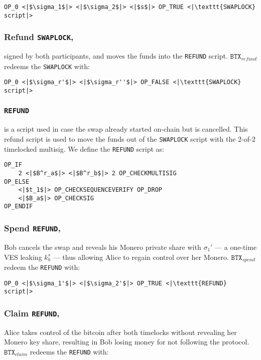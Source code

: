 \documentclass{llncs}
\newcommand{\BTX}{\texttt{BTX}}
\begin{document}
\begin{verbatim}
OP_0 <|$\sigma_1$|> <|$\sigma_2$|> <|$s$|> OP_TRUE <|\texttt{SWAPLOCK} script|>
\end{verbatim}

\subsubsection{Refund \texttt{SWAPLOCK},}
signed by both participants, and moves the funds into the \texttt{REFUND} script. $\BTX_\textit{refund}$ redeems the \texttt{SWAPLOCK} with:

\begin{verbatim}
OP_0 <|$\sigma_r'$|> <|$\sigma_r''$|> OP_FALSE <|\texttt{SWAPLOCK} script|>
\end{verbatim}

\subsubsection{\texttt{REFUND}}
is a script used in case the swap already started on-chain but is cancelled. This refund script is used to move the funds out of the \texttt{SWAPLOCK} script with the 2-of-2 timelocked multisig. We define the \texttt{REFUND} script as:

\begin{verbatim}
OP_IF
    2 <|$B^r_a$|> <|$B^r_b$|> 2 OP_CHECKMULTISIG
OP_ELSE
    <|$t_1$|> OP_CHECKSEQUENCEVERIFY OP_DROP
    <|$B_a$|> OP_CHECKSIG
OP_ENDIF
\end{verbatim}

\subsubsection{Spend \texttt{REFUND},}
Bob cancels the swap and reveals his Monero private share with $\sigma_1'$ --- a one-time VES leaking $k^s_b$ --- thus allowing Alice to regain control over her Monero. $\BTX_\textit{spend}$ redeem the \texttt{REFUND} with:

\begin{verbatim}
OP_0 <|$\sigma_1'$|> <|$\sigma_2'$|> OP_TRUE <|\texttt{REFUND} script|>
\end{verbatim}

\subsubsection{Claim \texttt{REFUND},}
Alice takes control of the bitcoin after both timelocks without revealing her Monero key share, resulting in Bob losing money for not following the protocol. $\BTX_\textit{claim}$ redeems the \texttt{REFUND} with:
\end{document}
